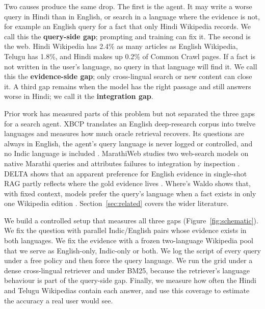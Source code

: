 Two causes produce the same drop. The first is the agent. It may write a worse query in Hindi than in English, or search in a language where the evidence is not, for example an English query for a fact that only Hindi Wikipedia records. We call this the \textbf{query-side gap}; prompting and training can fix it. The second is the web. Hindi Wikipedia has 2.4\% as many articles as English Wikipedia, Telugu has 1.8\%, and Hindi makes up 0.2\% of Common Crawl pages. If a fact is not written in the user's language, no query in that language will find it. We call this the \textbf{evidence-side gap}; only cross-lingual search or new content can close it. A third gap remains when the model has the right passage and still answers worse in Hindi; we call it the \textbf{integration gap}.

Prior work has measured parts of this problem but not separated the three gaps for a search agent. XBCP translates an English deep-research corpus into twelve languages and measures how much oracle retrieval recovers. Its questions are always in English, the agent's query language is never logged or controlled, and no Indic language is included \citep{a2606_15345}. MarathiWeb studies two web-search models on native Marathi queries and attributes failures to integration by inspection \citep{kale2026marathiweb}. DELTA shows that an apparent preference for English evidence in single-shot RAG partly reflects where the gold evidence lives \citep{a2601_02956}. Where's Waldo shows that, with fixed context, models prefer the query's language when a fact exists in only one Wikipedia edition \citep{a2610_00606}. Section~\ref{sec:related} covers the wider literature.

We build a controlled setup that measures all three gaps (Figure~\ref{fig:schematic}). We fix the question with parallel Indic/English pairs whose evidence exists in both languages. We fix the evidence with a frozen two-language Wikipedia pool that we serve as English-only, Indic-only or both. We log the script of every query under a free policy and then force the query language. We run the grid under a dense cross-lingual retriever and under BM25, because the retriever's language behaviour is part of the query-side gap. Finally, we measure how often the Hindi and Telugu Wikipedias contain each answer, and use this coverage to estimate the accuracy a real user would see.


